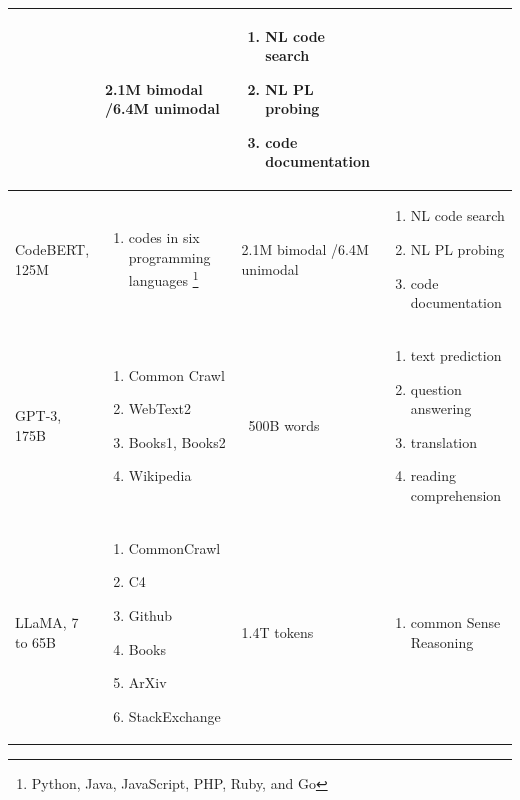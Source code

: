 \begin{table}[htbp]
\begin{tabular}{|p{2.5cm}|p{3.5cm}|p{2.2cm}|p{3.5cm}|}
& 2.1M bimodal /\newline 6.4M unimodal &  
\begin{enumerate}
    \item NL code search
    \item NL PL probing
    \item code documentation
\end{enumerate}
\\ \hline
CodeBERT, 125M & 
\begin{enumerate}
 \item codes in six programming languages \footnote{Python, Java,
JavaScript, PHP, Ruby, and Go}
\end{enumerate}
& 2.1M bimodal /\newline 6.4M unimodal &  
\begin{enumerate}
    \item NL code search
    \item NL PL probing
    \item code documentation
\end{enumerate}
\\ \hline
GPT-3, 175B & 
\begin{enumerate}
    \item Common Crawl
    \item WebText2
    \item Books1, Books2
    \item Wikipedia
\end{enumerate}
& ~500B words &  
\begin{enumerate}
    \item text prediction
    \item question answering
    \item translation
    \item reading comprehension
\end{enumerate}
\\ \hline
LLaMA, 7 to 65B & 
\begin{enumerate}
    \item CommonCrawl
    \item C4
    \item Github
    \item Books
    \item ArXiv
    \item StackExchange
\end{enumerate}
& 1.4T tokens & 
\begin{enumerate}
    \item common Sense Reasoning

\end{enumerate}
\end{tabular}
\end{table}
